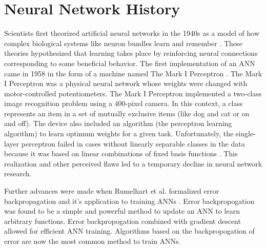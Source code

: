 

\section{Neural Network History}


Scientists first theorized artificial neural networks in the 1940s as a model of how complex biological systems like neuron bundles learn and remember \cite{Pitts1943, Hebb1949}. These theories hypothesized that learning takes place by reinforcing neural connections corresponding to some beneficial behavior. The first implementation of an ANN came in 1958 in the form of a machine named The Mark I Perceptron \cite{Rosenblatt1958, Rosenblatt1962}. The Mark I Perceptron was a physical neural network whose weights were changed with motor-controlled potentiometers. The Mark I Perceptron implemented a two-class image recognition problem using a 400-pixel camera. In this context, a class represents an item in a set of mutually exclusive items (like dog and cat or on and off). The device also included an algorithm (the perceptron learning algorithm) to learn optimum weights for a given task. Unfortunately, the single-layer perceptron failed in cases without linearly separable classes in the data because it was based on linear combinations of fixed basis functions \cite{Bishop2006, Minsky1969}. This realization and other perceived flaws led to a temporary decline in neural network research.




Further advances were made when Rumelhart et al. formalized error backpropagation and it's application to training ANNs \cite{Rumelhart1986}. Error backpropogation was found to be a simple and powerful method to update an ANN to learn arbitrary functions. Error backpropogation combined with gradient descent allowed for efficient ANN training. Algorithms based on the backpropogation of error are now the most common method to train ANNs. %

